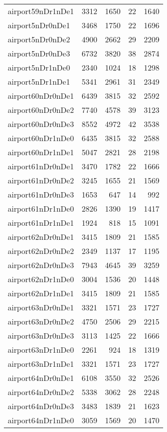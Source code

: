 \begin{longtable}{lrrrr}
airport59nDr1nDe1 & 3312 & 1650 & 22 & 1640 \\
airport5nDr0nDe1 & 3468 & 1750 & 22 & 1696 \\
airport5nDr0nDe2 & 4900 & 2662 & 29 & 2209 \\
airport5nDr0nDe3 & 6732 & 3820 & 38 & 2874 \\
airport5nDr1nDe0 & 2340 & 1024 & 18 & 1298 \\
airport5nDr1nDe1 & 5341 & 2961 & 31 & 2349 \\
airport60nDr0nDe1 & 6439 & 3815 & 32 & 2592 \\
airport60nDr0nDe2 & 7740 & 4578 & 39 & 3123 \\
airport60nDr0nDe3 & 8552 & 4972 & 42 & 3538 \\
airport60nDr1nDe0 & 6435 & 3815 & 32 & 2588 \\
airport60nDr1nDe1 & 5047 & 2821 & 28 & 2198 \\
airport61nDr0nDe1 & 3470 & 1782 & 22 & 1666 \\
airport61nDr0nDe2 & 3245 & 1655 & 21 & 1569 \\
airport61nDr0nDe3 & 1653 & 647 & 14 & 992 \\
airport61nDr1nDe0 & 2826 & 1390 & 19 & 1417 \\
airport61nDr1nDe1 & 1924 & 818 & 15 & 1091 \\
airport62nDr0nDe1 & 3415 & 1809 & 21 & 1585 \\
airport62nDr0nDe2 & 2349 & 1137 & 17 & 1195 \\
airport62nDr0nDe3 & 7943 & 4645 & 39 & 3259 \\
airport62nDr1nDe0 & 3004 & 1536 & 20 & 1448 \\
airport62nDr1nDe1 & 3415 & 1809 & 21 & 1585 \\
airport63nDr0nDe1 & 3321 & 1571 & 23 & 1727 \\
airport63nDr0nDe2 & 4750 & 2506 & 29 & 2215 \\
airport63nDr0nDe3 & 3113 & 1425 & 22 & 1666 \\
airport63nDr1nDe0 & 2261 & 924 & 18 & 1319 \\
airport63nDr1nDe1 & 3321 & 1571 & 23 & 1727 \\
airport64nDr0nDe1 & 6108 & 3550 & 32 & 2526 \\
airport64nDr0nDe2 & 5338 & 3062 & 28 & 2248 \\
airport64nDr0nDe3 & 3483 & 1839 & 21 & 1623 \\
airport64nDr1nDe0 & 3059 & 1569 & 20 & 1470 \\

\end{longtable}

